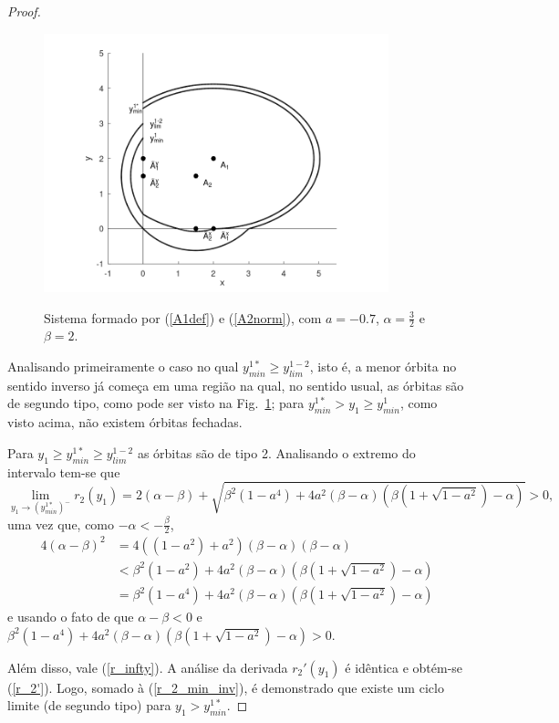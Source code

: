 \begin{proof}
\begin{figure}[H]
\centering
\includegraphics[width=10cm]{images/y_min_lim.png}\\
\caption{\label{y_min_lim}Sistema formado por (\ref{A1def}) e (\ref{A2norm}), com $a=-0.7$, $\alpha=\frac{3}{2}$ e $\beta=2$.}
\end{figure}

Analisando primeiramente o caso no qual $y_{min}^{1*}\geq y_{lim}^{1-2}$, isto é, a menor órbita no sentido inverso já começa em uma região na qual, no sentido usual, as órbitas são de segundo tipo, como pode ser visto na Fig.~\ref{y_min_lim}; para $y_{min}^{1*} > y_1\geq y_{min}^1$, como visto acima, não existem órbitas fechadas.  

Para $y_1\geq y_{min}^{1*}\geq y_{lim}^{1-2}$ as órbitas são de tipo 2. Analisando o extremo do intervalo tem-se que
\begin{equation}
\label{r_2_min_inv}
    \lim_{y_1\rightarrow (y_{min}^{1*})^-}r_2(y_1)=2(\alpha-\beta)+\sqrt{\beta^2(1-a^4)+4a^2(\beta-\alpha)\left(\beta\left(1+\sqrt{1-a^2}\right)-\alpha\right)}>0,
\end{equation}
uma vez que, como $-\alpha<-\frac{\beta}{2}$,
\begin{align*}
4(\alpha-\beta)^2&=4((1-a^2)+a^2)(\beta-\alpha)(\beta-\alpha)
\\&<\beta^2(1-a^2)+4a^2(\beta-\alpha)\left(\beta\left(1+\sqrt{1-a^2}\right)-\alpha\right)
\\&=\beta^2(1-a^4)+4a^2(\beta-\alpha)\left(\beta\left(1+\sqrt{1-a^2}\right)-\alpha\right)
\end{align*}
e usando o fato de que $\alpha-\beta<0$ e $\beta^2(1-a^4)+4a^2(\beta-\alpha)\left(\beta\left(1+\sqrt{1-a^2}\right)-\alpha\right)>0$.

Além disso, vale (\ref{r_infty}). A análise da derivada $r_2'(y_1)$ é idêntica e obtém-se (\ref{r_2'}). Logo, somado à (\ref{r_2_min_inv}), é demonstrado que existe um ciclo limite (de segundo tipo) para $y_1> y_{min}^{1*}$.


\end{proof}
